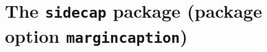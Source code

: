\documentclass[12pt,draft,a4paper,twoside]{article}
\begin{document}
  
\section*{The \texttt{sidecap} package (package option \texttt{margincaption})}

\begin{SCfigure}[][bh]
  \caption{\CAPi}%
\end{SCfigure}

\MARKER

\clearpage

\begin{SCfigure}
  \caption{\CAPi}%
\end{SCfigure}

\MARKER
\end{document}
